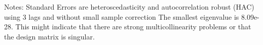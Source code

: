 Notes: \newline
 [1] Standard Errors are heteroscedasticity and autocorrelation robust (HAC) using 3 lags and without small sample correction \newline
 [2] The smallest eigenvalue is 8.09e-28. This might indicate that there are \newline
 strong multicollinearity problems or that the design matrix is singular.